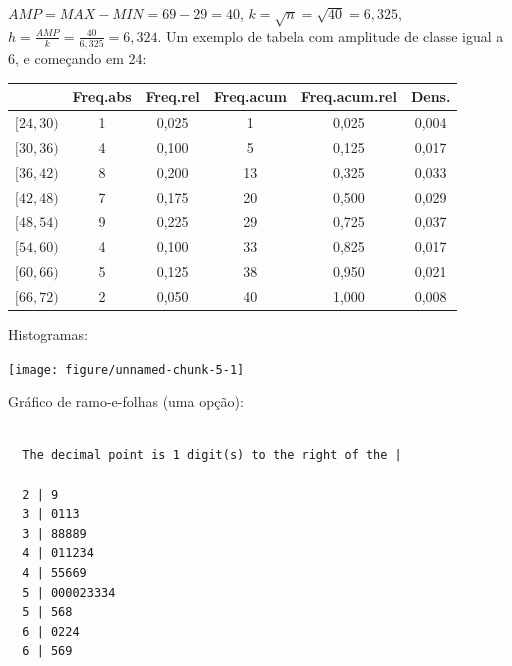 \documentclass[a4paper,11pt,fleqn]{article}\usepackage[]{graphicx}\usepackage[]{color}
\makeatletter
\newenvironment{kframe}{%
 \def\at@end@of@kframe{}%
 \ifinner\ifhmode%
  \def\at@end@of@kframe{\end{minipage}}%
  \begin{minipage}{\columnwidth}%
 \fi\fi%
 \def\FrameCommand##1{\hskip\@totalleftmargin \hskip-\fboxsep
 \colorbox{shadecolor}{##1}\hskip-\fboxsep
     \hskip-\linewidth \hskip-\@totalleftmargin \hskip\columnwidth}%
 \MakeFramed {\advance\hsize-\width
   \@totalleftmargin\z@ \linewidth\hsize
   \@setminipage}}%
 {\par\unskip\endMakeFramed%
 \at@end@of@kframe}
\newenvironment{knitrout}{}{} %
\theoremstyle{definition}
\makeatother
\begin{document}
\begin{compactenum}[7.]

\item $AMP = MAX - MIN = 69-29 = 40$, $k = \sqrt{n} = \sqrt{40} =
  6,325$, $h = \frac{AMP}{k} = \frac{40}{6,325} = 6,324$. Um exemplo de
  tabela com amplitude de classe igual a 6, e começando em 24:
\begin{table}[ht]
\centering
\begin{tabular}{cccccc}
  \hline
 & Freq.abs & Freq.rel & Freq.acum & Freq.acum.rel & Dens. \\ 
  \hline
$[24,30)$ &    1 & 0,025 &    1 & 0,025 & 0,004 \\ 
  $[30,36)$ &    4 & 0,100 &    5 & 0,125 & 0,017 \\ 
  $[36,42)$ &    8 & 0,200 &   13 & 0,325 & 0,033 \\ 
  $[42,48)$ &    7 & 0,175 &   20 & 0,500 & 0,029 \\ 
  $[48,54)$ &    9 & 0,225 &   29 & 0,725 & 0,037 \\ 
  $[54,60)$ &    4 & 0,100 &   33 & 0,825 & 0,017 \\ 
  $[60,66)$ &    5 & 0,125 &   38 & 0,950 & 0,021 \\ 
  $[66,72)$ &    2 & 0,050 &   40 & 1,000 & 0,008 \\ 
   \hline
\end{tabular}
\end{table}

Histogramas:
\begin{knitrout}\small
{}\color{fgcolor}

{\centering \texttt{[image: figure/unnamed-chunk-5-1]} 

}



\end{knitrout}

Gráfico de ramo-e-folhas (uma opção):

\begin{knitrout}\small
{}\color{fgcolor}\begin{kframe}
\begin{verbatim}

  The decimal point is 1 digit(s) to the right of the |

  2 | 9
  3 | 0113
  3 | 88889
  4 | 011234
  4 | 55669
  5 | 000023334
  5 | 568
  6 | 0224
  6 | 569
\end{verbatim}
\end{kframe}
\end{knitrout}

\end{compactenum}
\end{document}
